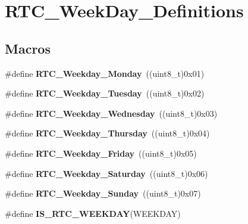 \hypertarget{group___r_t_c___week_day___definitions}{}\section{R\+T\+C\+\_\+\+Week\+Day\+\_\+\+Definitions}
\label{group___r_t_c___week_day___definitions}
\subsection*{Macros}
\begin{DoxyCompactItemize}
\item 
\hypertarget{group___r_t_c___week_day___definitions_ga7401371e61060e5d5fa2bf81f5369f02}{}\#define {\bfseries R\+T\+C\+\_\+\+Weekday\+\_\+\+Monday}~((uint8\+\_\+t)0x01)\label{group___r_t_c___week_day___definitions_ga7401371e61060e5d5fa2bf81f5369f02}

\item 
\hypertarget{group___r_t_c___week_day___definitions_ga23f9646fb7114c436d4e822b88101757}{}\#define {\bfseries R\+T\+C\+\_\+\+Weekday\+\_\+\+Tuesday}~((uint8\+\_\+t)0x02)\label{group___r_t_c___week_day___definitions_ga23f9646fb7114c436d4e822b88101757}

\item 
\hypertarget{group___r_t_c___week_day___definitions_gaa8de8244a8b3e44001871aa74282d3ae}{}\#define {\bfseries R\+T\+C\+\_\+\+Weekday\+\_\+\+Wednesday}~((uint8\+\_\+t)0x03)\label{group___r_t_c___week_day___definitions_gaa8de8244a8b3e44001871aa74282d3ae}

\item 
\hypertarget{group___r_t_c___week_day___definitions_gac2413b21a6893d2003334f19b59e137d}{}\#define {\bfseries R\+T\+C\+\_\+\+Weekday\+\_\+\+Thursday}~((uint8\+\_\+t)0x04)\label{group___r_t_c___week_day___definitions_gac2413b21a6893d2003334f19b59e137d}

\item 
\hypertarget{group___r_t_c___week_day___definitions_ga556885ed7436fd0128e21ff48d7d0044}{}\#define {\bfseries R\+T\+C\+\_\+\+Weekday\+\_\+\+Friday}~((uint8\+\_\+t)0x05)\label{group___r_t_c___week_day___definitions_ga556885ed7436fd0128e21ff48d7d0044}

\item 
\hypertarget{group___r_t_c___week_day___definitions_gafdca8b8c2b9c56f9715efdf6ba96a8a9}{}\#define {\bfseries R\+T\+C\+\_\+\+Weekday\+\_\+\+Saturday}~((uint8\+\_\+t)0x06)\label{group___r_t_c___week_day___definitions_gafdca8b8c2b9c56f9715efdf6ba96a8a9}

\item 
\hypertarget{group___r_t_c___week_day___definitions_ga9a6a6992dfefab667878480f5565c928}{}\#define {\bfseries R\+T\+C\+\_\+\+Weekday\+\_\+\+Sunday}~((uint8\+\_\+t)0x07)\label{group___r_t_c___week_day___definitions_ga9a6a6992dfefab667878480f5565c928}

\item 
\#define {\bfseries I\+S\+\_\+\+R\+T\+C\+\_\+\+W\+E\+E\+K\+D\+A\+Y}(W\+E\+E\+K\+D\+A\+Y)
\end{DoxyCompactItemize}


